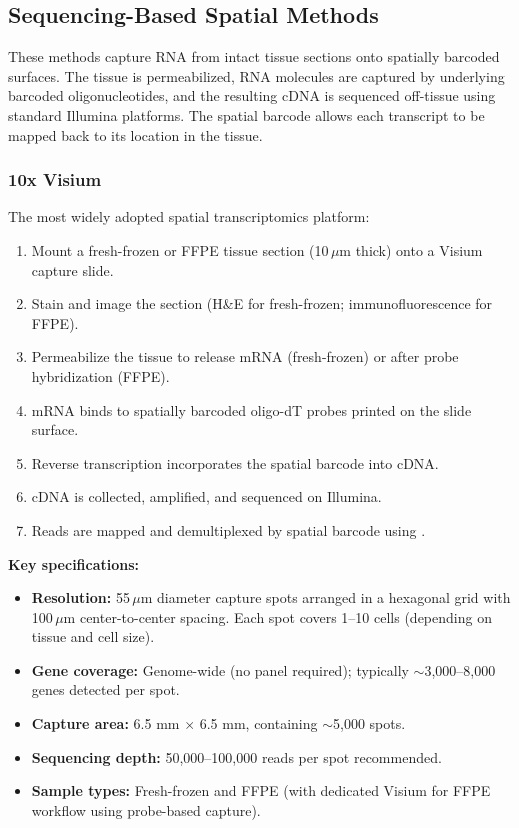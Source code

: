 \subsection{Sequencing-Based Spatial Methods}
\label{sec:spatial:seqbased}

These methods capture RNA from intact tissue sections onto spatially barcoded
surfaces. The tissue is permeabilized, RNA molecules are captured by
underlying barcoded oligonucleotides, and the resulting cDNA is sequenced
off-tissue using standard Illumina platforms. The spatial barcode allows each
transcript to be mapped back to its location in the tissue.

\subsubsection{10x Visium}

The most widely adopted spatial transcriptomics platform:

\begin{protocolbox}[title={10x Visium Workflow}]
\begin{enumerate}[nosep]
  \item Mount a fresh-frozen or FFPE tissue section (10\,$\mu$m thick) onto a
    Visium capture slide.
  \item Stain and image the section (H\&E for fresh-frozen; immunofluorescence
    for FFPE).
  \item Permeabilize the tissue to release mRNA (fresh-frozen) or after probe
    hybridization (FFPE).
  \item mRNA binds to spatially barcoded oligo-dT probes printed on the slide
    surface.
  \item Reverse transcription incorporates the spatial barcode into cDNA.
  \item cDNA is collected, amplified, and sequenced on Illumina.
  \item Reads are mapped and demultiplexed by spatial barcode using
    .
\end{enumerate}
\end{protocolbox}

\textbf{Key specifications:}
\begin{itemize}[nosep]
  \item \textbf{Resolution:} 55\,$\mu$m diameter capture spots arranged in a
    hexagonal grid with 100\,$\mu$m center-to-center spacing. Each spot covers
    1--10 cells (depending on tissue and cell size).
  \item \textbf{Gene coverage:} Genome-wide (no panel required); typically
    $\sim$3,000--8,000 genes detected per spot.
  \item \textbf{Capture area:} 6.5 mm $\times$ 6.5 mm, containing $\sim$5,000
    spots.
  \item \textbf{Sequencing depth:} 50,000--100,000 reads per spot recommended.
  \item \textbf{Sample types:} Fresh-frozen and FFPE (with dedicated Visium
    for FFPE workflow using probe-based capture).
\end{itemize}

